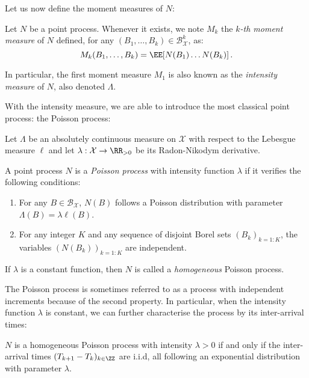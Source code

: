 Let us now define the moment measures of $N$:
\begin{definition}
    Let $N$ be a point process. Whenever it exists, we note $M_k$ the \emph{$k$-th moment measure} of $N$ defined, for any $(B_1,\ldots, B_k)\in\mathcal{B}_{\mathcal{X}}^k$, as:
    \[M_k(B_1, \ldots, B_k) = \EE[N(B_1)\ldots N(B_k)]\,.\]

    In particular, the first moment measure $M_1$ is also known as the \emph{intensity measure} of $N$, also denoted $\Lambda$.
\end{definition}
With the intensity measure, we are able to introduce the most classical point process: the Poisson process:

\begin{definition}\label{def:chap1_poisson_process}
    Let $\Lambda$ be an absolutely continuous measure on $\mathcal{X}$ with respect to the Lebesgue measure $\ell$ and let $\lambda:\mathcal{X}\to\RR_{>0}$ be its Radon-Nikodym derivative.

    A point process $N$ is a \emph{Poisson process} with intensity function $\lambda$ if it verifies the following conditions:
    \begin{enumerate}
        \item For any $B\in\mathcal{B}_{\mathcal{X}}$, $N(B)$ follows a Poisson distribution with parameter $\Lambda(B) = \lambda \ell(B)$.
        \item For any integer $K$ and any sequence of disjoint Borel sets $(B_k)_{k=1:K}$, the variables $(N(B_k))_{k=1:K}$ are independent.
    \end{enumerate}

    If $\lambda$ is a constant function, then $N$ is called a \emph{homogeneous} Poisson process.
\end{definition}
The Poisson process is sometimes referred to as a process with independent increments because of the second property.
In particular, when the intensity function $\lambda$ is constant, we can further characterise the process by its inter-arrival times:

\begin{theorem}{\parencite[Theorem 7.2]{Last2017}}\label{th:chap1_interarrival_exponential}

    $N$ is a homogeneous Poisson process with intensity $\lambda > 0$ if and only if the inter-arrival times $(T_{k+1} - T_k)_{k\in\ZZ}$ are i.i.d, all following an exponential distribution with parameter $\lambda$.
\end{theorem}


